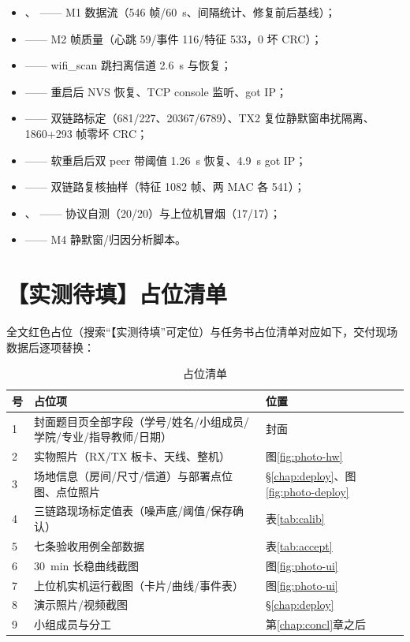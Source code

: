 \begin{itemize}
  \item {}、 —— M1 数据流（546 帧/60~s、间隔统计、修复前后基线）；
  \item {} —— M2 帧质量（心跳 59/事件 116/特征 533，0 坏 CRC）；
  \item {} —— wifi\_scan 跳扫离信道 2.6~s 与恢复；
  \item {} —— 重启后 NVS 恢复、TCP console 监听、got IP；
  \item {} —— 双链路标定（681/227、20367/6789）、TX2 复位静默窗串扰隔离、1860+293 帧零坏 CRC；
  \item {} —— 软重启后双 peer 带阈值 1.26~s 恢复、4.9~s got IP；
  \item {} —— 双链路复核抽样（特征 1082 帧、两 MAC 各 541）；
  \item {}、 —— 协议自测（20/20）与上位机冒烟（17/17）；
  \item {} —— M4 静默窗/归因分析脚本。
\end{itemize}

\section{【实测待填】占位清单}

全文红色占位（搜索“【实测待填”可定位）与任务书占位清单对应如下，交付现场数据后逐项替换：

\begin{table}[htbp]
  \centering
  \caption{占位清单}
  \label{tab:placeholder}
  \begin{tabular}{p{0.8cm}p{6.8cm}p{6.4cm}}
    \toprule
    \textbf{号} & \textbf{占位项} & \textbf{位置} \\
    \midrule
    1 & 封面题目页全部字段（学号/姓名/小组成员/学院/专业/指导教师/日期） & 封面 \\
    2 & 实物照片（RX/TX 板卡、天线、整机） & 图\ref{fig:photo-hw} \\
    3 & 场地信息（房间/尺寸/信道）与部署点位图、点位照片 & \S\ref{chap:deploy}、图\ref{fig:photo-deploy} \\
    4 & 三链路现场标定值表（噪声底/阈值/保存确认） & 表\ref{tab:calib} \\
    5 & 七条验收用例全部数据 & 表\ref{tab:accept} \\
    6 & 30~min 长稳曲线截图 & 图\ref{fig:photo-ui} \\
    7 & 上位机实机运行截图（卡片/曲线/事件表） & 图\ref{fig:photo-ui} \\
    8 & 演示照片/视频截图 & \S\ref{chap:deploy} \\
    9 & 小组成员与分工 & 第\ref{chap:concl}章之后 \\
    \bottomrule
  \end{tabular}
\end{table}
